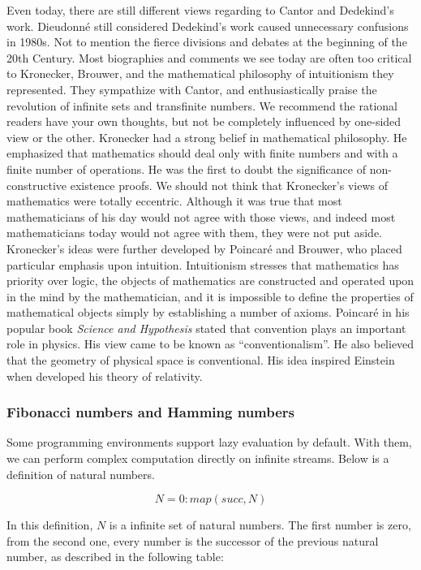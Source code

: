 \documentclass{article}
\begin{document}
Even today, there are still different views regarding to Cantor and Dedekind's work. Dieudonné still considered Dedekind's work caused unnecessary confusions in 1980s. Not to mention the fierce divisions and debates at the beginning of the 20th Century. Most biographies and comments we see today are often too critical to Kronecker, Brouwer, and the mathematical philosophy of intuitionism they represented. They sympathize with Cantor, and enthusiastically praise the revolution of infinite sets and transfinite numbers. We recommend the rational readers have your own thoughts, but not be completely influenced by one-sided view or the other. Kronecker had a strong belief in mathematical philosophy. He emphasized that mathematics should deal only with finite numbers and with a finite number of operations. He was the first to doubt the significance of non-constructive existence proofs. We should not think that Kronecker's views of mathematics were totally eccentric. Although it was true that most mathematicians of his day would not agree with those views, and indeed most mathematicians today would not agree with them, they were not put aside. Kronecker's ideas were further developed by Poincaré and Brouwer, who placed particular emphasis upon intuition. Intuitionism stresses that mathematics has priority over logic, the objects of mathematics are constructed and operated upon in the mind by the mathematician, and it is impossible to define the properties of mathematical objects simply by establishing a number of axioms. Poincaré in his popular book {\em  Science and Hypothesis} stated that convention plays an important role in physics. His view came to be known as ``conventionalism''. He also believed that the geometry of physical space is conventional. His idea inspired Einstein when developed his theory of relativity.

\subsubsection{Fibonacci numbers and Hamming numbers}

Some programming environments support lazy evaluation by default. With them, we can perform complex computation directly on infinite streams. Below is a definition of natural numbers.

\[
N = 0 : map(succ, N)
\]

In this definition, $N$ is a infinite set of natural numbers. The first number is zero, from the second one, every number is the successor of the previous natural number, as described in the following table:
\end{document}
